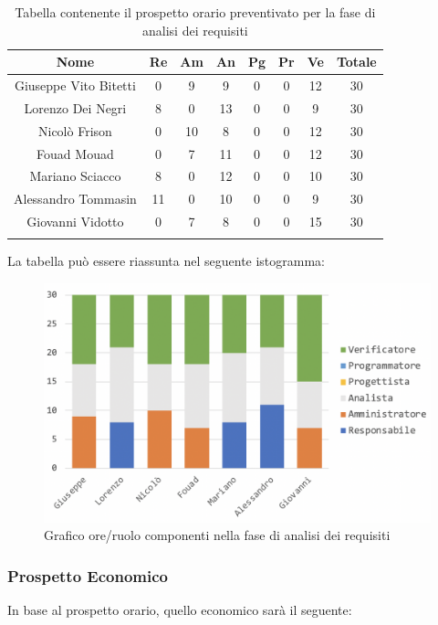 			\begin{longtable}{|c|c|c|c|c|c|c|c|}
				\hline
				\rowcolor{lighter-grayer}
				\textbf{Nome} & \textbf{Re} & \textbf{Am} & \textbf{An} & \textbf{Pg}  & \textbf{Pr}   & \textbf{Ve} & \textbf{Totale} \\
				\hline
				\endfirsthead
				
				\hline
				Giuseppe Vito Bitetti & 0 & 9 & 9 & 0 & 0 & 12 & 30\\
				\hline
				\hline
				Lorenzo Dei Negri & 8 & 0 & 13 & 0 & 0 & 9 & 30\\
				\hline
				\hline
				Nicolò Frison & 0 & 10 & 8 & 0 & 0 & 12 & 30\\
				\hline
				\hline
				Fouad Mouad & 0 & 7 & 11 & 0 & 0 & 12 & 30\\
				\hline
				\hline
				Mariano Sciacco & 8 & 0 & 12 & 0 & 0 & 10 & 30\\
				\hline
				\hline
				Alessandro Tommasin & 11 & 0 & 10 & 0 & 0 & 9 & 30\\
				\hline
				\hline
				Giovanni Vidotto & 0 & 7 & 8 & 0 & 0 & 15 & 30\\
				\hline 
				\caption{Tabella contenente il prospetto orario preventivato per la fase di analisi dei requisiti}
			\end{longtable}
			\pagebreak
		
			La tabella può essere riassunta nel seguente istogramma:
		
			\begin{figure}[H]
				\centering
				\includegraphics[width=0.8\linewidth]{./images/analisi1.png}
				\caption{Grafico ore/ruolo componenti nella fase di analisi dei requisiti}
				\label{fig:grafico suddivione ruoli fase analisi dei requisiti}
			\end{figure}
		
			\subsubsection{Prospetto Economico}
			In base al prospetto orario, quello economico sarà il seguente: 
			
